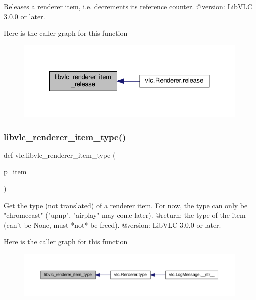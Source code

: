 \begin{DoxyVerb}Releases a renderer item, i.e. decrements its reference counter.
@version: LibVLC 3.0.0 or later.
\end{DoxyVerb}
 Here is the caller graph for this function\+:
\nopagebreak
\begin{figure}[H]
\begin{center}
\leavevmode
\includegraphics[width=327pt]{namespacevlc_a5086523148dd38cc9d179a9cbf9e47b1_icgraph}
\end{center}
\end{figure}
\mbox{\label{namespacevlc_ab762670fe5ec4fce2445ec301981eb59}} 
\subsubsection{\texorpdfstring{libvlc\+\_\+renderer\+\_\+item\+\_\+type()}{libvlc\_renderer\_item\_type()}}
{\footnotesize\ttfamily def vlc.\+libvlc\+\_\+renderer\+\_\+item\+\_\+type (\begin{DoxyParamCaption}\item[{}]{p\+\_\+item }\end{DoxyParamCaption})}

\begin{DoxyVerb}Get the type (not translated) of a renderer item. For now, the type can only
be "chromecast" ("upnp", "airplay" may come later).
@return: the type of the item (can't be None, must *not* be freed).
@version: LibVLC 3.0.0 or later.
\end{DoxyVerb}
 Here is the caller graph for this function\+:
\nopagebreak
\begin{figure}[H]
\begin{center}
\leavevmode
\includegraphics[width=350pt]{namespacevlc_ab762670fe5ec4fce2445ec301981eb59_icgraph}
\end{center}
\end{figure}
\mbox{\label{namespacevlc_aeb98ef45d43c6f9348d8450963f08840}} 
